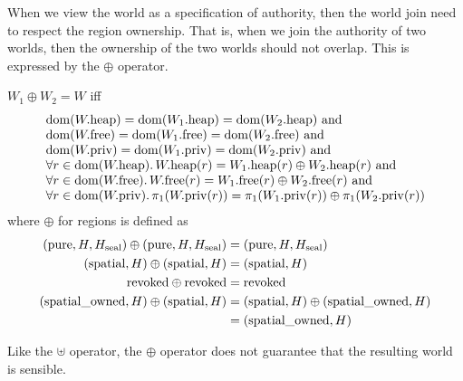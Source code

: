 \begin{jversion}
When we view the world as a specification of authority, then the world join need to respect the region ownership.
That is, when we join the authority of two worlds, then the ownership of the two worlds should not overlap.
This is expressed by the $\oplus$ operator.
\begin{definition}
  $W_1 \oplus W_2 = W$ iff
  \[
  \begin{array}[t]{l}
    \dom(\pwheap) = \dom(\pwheap[W_1]) = \dom(\pwheap[W_2]) \tand \\
    \dom(\pwfree) = \dom(\pwfree[W_1]) = \dom(\pwfree[W_2]) \tand \\
    \dom(\pwpriv) = \dom(\pwpriv[W_1]) = \dom(\pwpriv[W_2]) \tand \\
    \forall r \in \dom(\pwheap) \ldotp \pwheap(r) = \pwheap[W_1](r) \oplus \pwheap[W_2](r) \tand \\
    \forall r \in \dom(\pwfree) \ldotp \pwfree(r) = \pwfree[W_1](r) \oplus \pwfree[W_2](r) \tand \\
    \forall r \in \dom(\pwpriv) \ldotp \pi_1(\pwpriv(r)) = \pi_1(\pwpriv[W_1](r)) \oplus \pi_1(\pwpriv[W_2](r))
  \end{array}
  \]
  where $\oplus$ for regions is defined as
\begin{align*}
  (\pure,H,H_{\mathrm{seal}}) \oplus (\pure,H,H_{\mathrm{seal}}) =  & \; (\pure,H,H_{\mathrm{seal}}) \\
  (\spatial,H) \oplus (\spatial,H) =  & \; (\spatial,H) \\
  \revoked \oplus \revoked = & \; \revoked \\
  (\spatialo,H) \oplus (\spatial,H) = & \; (\spatial,H) \oplus (\spatialo,H)\\
                                           =  & \; (\spatialo,H)
\end{align*}
\end{definition}
Like the $\uplus$ operator, the $\oplus$ operator does not guarantee that the resulting world is sensible.



\end{jversion}
